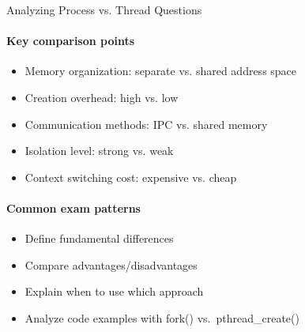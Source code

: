 \begin{KR}{Analyzing Process vs. Thread Questions}
    \paragraph{Key comparison points}
    \begin{itemize}
        \item Memory organization: separate vs. shared address space
        \item Creation overhead: high vs. low
        \item Communication methods: IPC vs. shared memory
        \item Isolation level: strong vs. weak
        \item Context switching cost: expensive vs. cheap
    \end{itemize}
    
    \paragraph{Common exam patterns}
    \begin{itemize}
        \item Define fundamental differences
        \item Compare advantages/disadvantages
        \item Explain when to use which approach
        \item Analyze code examples with fork() vs.\ pthread\_create()
    \end{itemize}
\end{KR}


